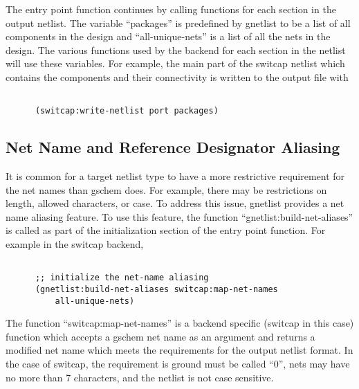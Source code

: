 \documentclass{article}
\begin{document}
The entry point function continues by calling functions for each
section in the output netlist.  The variable ``packages'' is
predefined by gnetlist to be a list of all components in the design
and ``all-unique-nets'' is a list of all the nets in the design.  The
various functions used by the backend for each section in the netlist
will use these variables.  For example, the main part of the switcap
netlist which contains the components and their connectivity is
written to the output file with

\begin{verbatim}

      (switcap:write-netlist port packages)

\end{verbatim}

\subsection{Net Name and Reference Designator Aliasing}
It is common for a target netlist type to have a more restrictive
requirement for the net names than gschem does.  For example, there
may be restrictions on length, allowed characters, or case.  To
address this issue, gnetlist provides a net name aliasing feature.  To
use this feature, the function ``gnetlist:build-net-aliases'' is
called as part of the initialization section of the entry point
function.  For example in the switcap backend,

\begin{verbatim}

      ;; initialize the net-name aliasing
      (gnetlist:build-net-aliases switcap:map-net-names
          all-unique-nets)

\end{verbatim}

The function ``switcap:map-net-names'' is a backend specific (switcap
in this case) function which accepts a gschem net name as an argument
and returns a modified net name which meets the requirements for the
output netlist format.  In the case of switcap, the requirement is
ground must be called ``0'', nets may have no more than 7 characters,
and the netlist is not case sensitive.  
\end{document}
